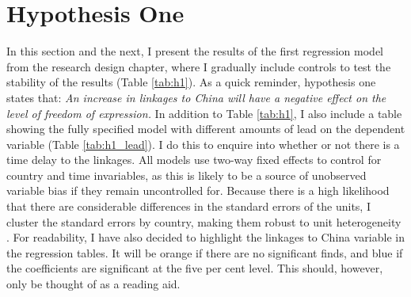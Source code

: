 \section{Hypothesis One} \label{sec:h1}
In this section and the next, I present the results of the first regression model from the research design chapter, where I gradually include controls to test the stability of the results (Table \ref{tab:h1}). As a quick reminder, hypothesis one states that: \textit{An increase in linkages to China will have a negative effect on the level of freedom of expression.} In addition to Table \ref{tab:h1}, I also include a table showing the fully specified model with different amounts of lead on the dependent variable (Table \ref{tab:h1_lead}). I do this to enquire into whether or not there is a time delay to the linkages. All models use two-way fixed effects to control for country and time invariables, as this is likely to be a source of unobserved variable bias if they remain uncontrolled for. Because there is a high likelihood that there are considerable differences in the standard errors of the units, I cluster the standard errors by country, making them robust to unit heterogeneity \citep{moulton_random_1986, abadie_when_2023, huntington-klein_effect_2022}. For readability, I have also decided to highlight the linkages to China variable in the regression tables. It will be orange if there are no significant finds, and blue if the coefficients are significant at the five per cent level. This should, however, only be thought of as a reading aid. 

